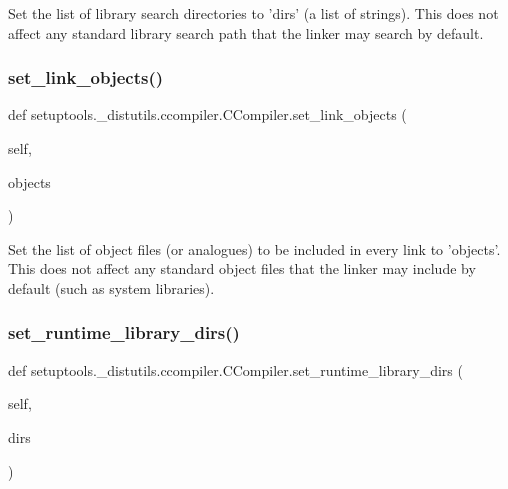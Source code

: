 \begin{DoxyVerb}Set the list of library search directories to 'dirs' (a list of
strings).  This does not affect any standard library search path
that the linker may search by default.
\end{DoxyVerb}
 \mbox{\label{classsetuptools_1_1__distutils_1_1ccompiler_1_1CCompiler_a2b052eeaa25d63e2d6b27eb7d12b10bf}} 
\subsubsection{\texorpdfstring{set\+\_\+link\+\_\+objects()}{set\_link\_objects()}}
{\footnotesize\ttfamily def setuptools.\+\_\+distutils.\+ccompiler.\+C\+Compiler.\+set\+\_\+link\+\_\+objects (\begin{DoxyParamCaption}\item[{}]{self,  }\item[{}]{objects }\end{DoxyParamCaption})}

\begin{DoxyVerb}Set the list of object files (or analogues) to be included in
every link to 'objects'.  This does not affect any standard object
files that the linker may include by default (such as system
libraries).
\end{DoxyVerb}
 \mbox{\label{classsetuptools_1_1__distutils_1_1ccompiler_1_1CCompiler_a9b6b4c393fce0440e18e78a144dda81f}} 
\subsubsection{\texorpdfstring{set\+\_\+runtime\+\_\+library\+\_\+dirs()}{set\_runtime\_library\_dirs()}}
{\footnotesize\ttfamily def setuptools.\+\_\+distutils.\+ccompiler.\+C\+Compiler.\+set\+\_\+runtime\+\_\+library\+\_\+dirs (\begin{DoxyParamCaption}\item[{}]{self,  }\item[{}]{dirs }\end{DoxyParamCaption})}

